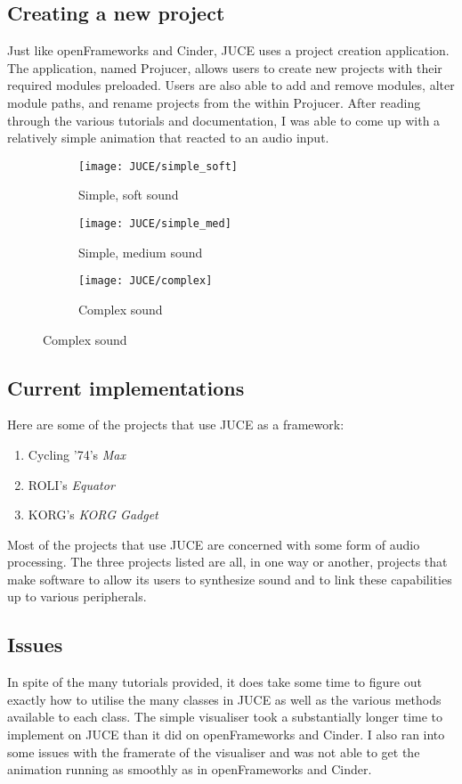 \documentclass[../main_frameworkreview.tex]{subfiles}
\begin{document}
\subsection{Creating a new project}
Just like openFrameworks and Cinder, JUCE uses a project creation application. The application, named Projucer, allows users to create new projects with their required modules preloaded. Users are also able to add and remove modules, alter module paths, and rename projects from the within Projucer. After reading through the various tutorials and documentation, I was able to come up with a relatively simple animation that reacted to an audio input.
\begin{figure}[h]
  \begin{subfigure}{0.5\textwidth}
    \texttt{[image: JUCE/simple\_soft]}
    \caption{Simple, soft sound}
  \end{subfigure}
  \begin{subfigure}{0.5\textwidth}
    \texttt{[image: JUCE/simple\_med]}
    \caption{Simple, medium sound}
  \end{subfigure}
  \begin{subfigure}{0.5\textwidth}
    \texttt{[image: JUCE/complex]}
    \caption{Complex sound}
  \end{subfigure}
\end{figure}
\subsection{Current implementations}
Here are some of the projects that use JUCE as a framework:
\begin{enumerate}
\item Cycling '74's \textit{Max}
\item ROLI's \textit{Equator}
\item KORG's \textit{KORG Gadget}
\end{enumerate}
Most of the projects that use JUCE are concerned with some form of audio processing.\cite{JUCE} The three projects listed are all, in one way or another, projects that make software to allow its users to synthesize sound and to link these capabilities up to various peripherals.

\subsection{Issues}
In spite of the many tutorials provided, it does take some time to figure out exactly how to utilise the many classes in JUCE as well as the various methods available to each class. The simple visualiser took a substantially longer time to implement on JUCE than it did on openFrameworks and Cinder. I also ran into some issues with the framerate of the visualiser and was not able to get the animation running as smoothly as in openFrameworks and Cinder.
\end{document}

